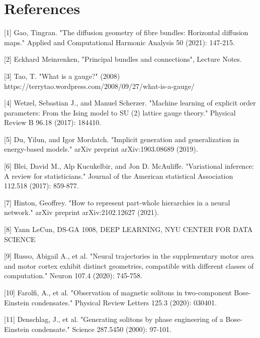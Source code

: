 \documentclass{article}
\begin{document}
\section*{References}

\small

[1] Gao, Tingran. "The diffusion geometry of fibre bundles: Horizontal diffusion maps." Applied and Computational Harmonic Analysis 50 (2021): 147-215.

[2] Eckhard Meinrenken, "Principal bundles and connections", Lecture Notes. 

[3] Tao, T. "What is a gauge?" (2008) https://terrytao.wordpress.com/2008/09/27/what-is-a-gauge/

[4] Wetzel, Sebastian J., and Manuel Scherzer. "Machine learning of explicit order parameters: From the Ising model to SU (2) lattice gauge theory." Physical Review B 96.18 (2017): 184410.


[5] Du, Yilun, and Igor Mordatch. "Implicit generation and generalization in energy-based models." arXiv preprint arXiv:1903.08689 (2019).

[6] Blei, David M., Alp Kucukelbir, and Jon D. McAuliffe. "Variational inference: A review for statisticians." Journal of the American statistical Association 112.518 (2017): 859-877.


[7] Hinton, Geoffrey. "How to represent part-whole hierarchies in a neural network." arXiv preprint arXiv:2102.12627 (2021).

[8]  Yann LeCun, DS-GA 1008, DEEP LEARNING, NYU CENTER FOR DATA SCIENCE

[9] Russo, Abigail A., et al. "Neural trajectories in the supplementary motor area and motor cortex exhibit distinct geometries, compatible with different classes of computation." Neuron 107.4 (2020): 745-758.

[10] Farolfi, A., et al. "Observation of magnetic solitons in two-component Bose-Einstein condensates." Physical Review Letters 125.3 (2020): 030401.

[11] Denschlag, J., et al. "Generating solitons by phase engineering of a Bose-Einstein condensate." Science 287.5450 (2000): 97-101.
\end{document}
